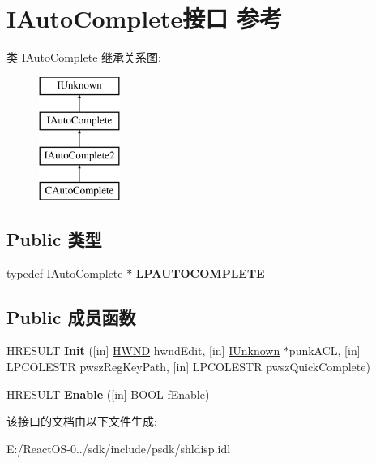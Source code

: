 \hypertarget{interface_i_auto_complete}{}\section{I\+Auto\+Complete接口 参考}
\label{interface_i_auto_complete}
类 I\+Auto\+Complete 继承关系图\+:\begin{figure}[H]
\begin{center}
\leavevmode
\includegraphics[height=4.000000cm]{interface_i_auto_complete}
\end{center}
\end{figure}
\subsection*{Public 类型}
\begin{DoxyCompactItemize}
\item 
\mbox{\label{interface_i_auto_complete_aa71276105081574fc925bbc410aae5f6}} 
typedef \hyperlink{interface_i_auto_complete}{I\+Auto\+Complete} $\ast$ {\bfseries L\+P\+A\+U\+T\+O\+C\+O\+M\+P\+L\+E\+TE}
\end{DoxyCompactItemize}
\subsection*{Public 成员函数}
\begin{DoxyCompactItemize}
\item 
\mbox{\label{interface_i_auto_complete_a5e6f3ca3546dda07a8c4e94f167eecc6}} 
H\+R\+E\+S\+U\+LT {\bfseries Init} (\mbox{[}in\mbox{]} \hyperlink{interfacevoid}{H\+W\+ND} hwnd\+Edit, \mbox{[}in\mbox{]} \hyperlink{interface_i_unknown}{I\+Unknown} $\ast$punk\+A\+CL, \mbox{[}in\mbox{]} L\+P\+C\+O\+L\+E\+S\+TR pwsz\+Reg\+Key\+Path, \mbox{[}in\mbox{]} L\+P\+C\+O\+L\+E\+S\+TR pwsz\+Quick\+Complete)
\item 
\mbox{\label{interface_i_auto_complete_aa9ffb14fe4ddecfdabc4f9b37c98d24c}} 
H\+R\+E\+S\+U\+LT {\bfseries Enable} (\mbox{[}in\mbox{]} B\+O\+OL f\+Enable)
\end{DoxyCompactItemize}


该接口的文档由以下文件生成\+:\begin{DoxyCompactItemize}
\item 
E\+:/\+React\+O\+S-\/0../sdk/include/psdk/shldisp.\+idl\end{DoxyCompactItemize}

